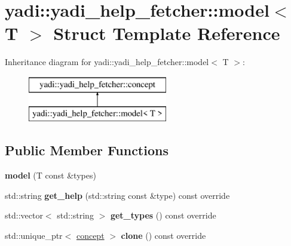 \hypertarget{structyadi_1_1yadi__help__fetcher_1_1model}{}\section{yadi\+:\+:yadi\+\_\+help\+\_\+fetcher\+:\+:model$<$ T $>$ Struct Template Reference}
\label{structyadi_1_1yadi__help__fetcher_1_1model}
Inheritance diagram for yadi\+:\+:yadi\+\_\+help\+\_\+fetcher\+:\+:model$<$ T $>$\+:\begin{figure}[H]
\begin{center}
\leavevmode
\includegraphics[height=2.000000cm]{structyadi_1_1yadi__help__fetcher_1_1model}
\end{center}
\end{figure}
\subsection*{Public Member Functions}
\begin{DoxyCompactItemize}
\item 
\mbox{\label{structyadi_1_1yadi__help__fetcher_1_1model_acc1a89ccb43bf1ac25e6310a34780b91}} 
{\bfseries model} (T const \&types)
\item 
\mbox{\label{structyadi_1_1yadi__help__fetcher_1_1model_a55fb870e3b8b3d3eef68f326c715ae3b}} 
std\+::string {\bfseries get\+\_\+help} (std\+::string const \&type) const override
\item 
\mbox{\label{structyadi_1_1yadi__help__fetcher_1_1model_aeaf0e669f8ab709d614c0dacf2738ba7}} 
std\+::vector$<$ std\+::string $>$ {\bfseries get\+\_\+types} () const override
\item 
\mbox{\label{structyadi_1_1yadi__help__fetcher_1_1model_ae1f281aae141ff7506a6e11909072e63}} 
std\+::unique\+\_\+ptr$<$ \hyperlink{structyadi_1_1yadi__help__fetcher_1_1concept}{concept} $>$ {\bfseries clone} () const override
\end{DoxyCompactItemize}
